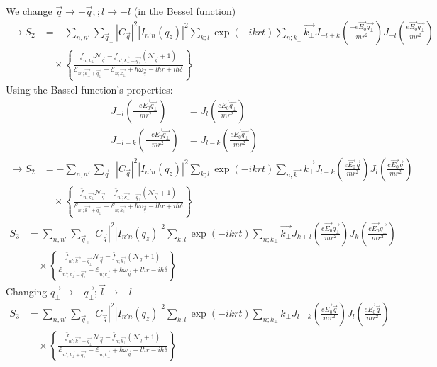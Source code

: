 \documentclass{article}
\begin{document}
We change $\vec{q}\to -\vec{q};;l\to -l$ (in the Bessel function)
\begin{align*}
\to S_2 &= - \sum_{n,n'} \sum_{\vec{q}_{\bot}} |C_{\vec{q}}|^2 |I_{n'n}(q_z)|^2 \sum_{k;l} \exp(-ikrt) \sum_{n;k_\bot}\vec{k_\bot} J_{-l+k} \left( \frac{-e\vec{E_0} \vec{q_\bot}}{m r^2} \right) J_{-l} \left( \frac{e\vec{E_0} \vec{q_\bot}}{m r^2} \right) \\
&\quad \times \left\{\frac{\bar{f}_{n;\vec{k_\bot}} \mathcal{N}_{\vec{q}} - \bar{f}_{n';\vec{k_\bot}+\vec{q_\bot}} (\mathcal{N}_{\vec{q}}+1)}{\mathcal{E}_{n';\vec{k_\bot}+\vec{q_\bot}} - \mathcal{E}_{n;\vec{k_\bot}} + \hbar \omega_{\vec{q}} - l\hbar r + i\hbar\delta} \right\}
\end{align*}
Using the Bassel function's properties:
\begin{align*}
    J_{-l} \left( \frac{-e\vec{E_0} \vec{q_\bot}}{m r^2} \right) &= J_l \left( \frac{e\vec{E_0} \vec{q_\bot}}{m r^2} \right)\\
J_{-l+k} \left( \frac{-e\vec{E_0} \vec{q_\bot}}{m r^2} \right) &= J_{l-k} \left( \frac{e\vec{E_0} \vec{q_\bot}}{m r^2} \right)
\end{align*}
\begin{align*}
    \to S_2 &= - \sum_{n,n'} \sum_{\vec{q}_{\bot}} |C_{\vec{q}}|^2 |I_{n'n}(q_z)|^2 \sum_{k;l} \exp(-ikrt) \sum_{n;\vec{k_\bot}}\vec{k_\bot} J_{l-k} \left( \frac{e\vec{E_0} \vec{q}}{m r^2} \right) J_{l} \left( \frac{e\vec{E_0} \vec{q}}{m r^2} \right) \\
&\quad \times \left\{\frac{\bar{f}_{n;\vec{k_\bot}} \mathcal{N}_{\vec{q}} - \bar{f}_{n';\vec{k_\bot}+\vec{q_\bot}} (\mathcal{N}_{\vec{q}}+1)}{\mathcal{E}_{n';\vec{k_\bot}+\vec{q_\bot}} - \mathcal{E}_{n;\vec{k_\bot}} + \hbar \omega_{\vec{q}} - l\hbar r + i\hbar\delta} \right\}
\end{align*}
\begin{align*}
 S_3 &= \sum_{n,n'} \sum_{\vec{q}_{\bot}} |C_{\vec{q}}|^2 |I_{n'n}(q_z)|^2 \sum_{k;l} \exp(-ikrt) \sum_{n;k_\bot}\vec{k_\bot} J_{k+l} \left( \frac{e\vec{E_0} \vec{q_\bot}}{m r^2} \right) J_{k} \left( \frac{e\vec{E_0} \vec{q_\bot}}{m r^2} \right) \\
&\quad \times \left\{\frac{\bar{f}_{n';\vec{k_\bot}-\vec{q_\bot}} \mathcal{N}_{\vec{q}} - \bar{f}_{n;\vec{k_\bot}} (\mathcal{N}_{q}+1)}{\mathcal{E}_{n';\vec{k_\bot}-\vec{q_\bot}} - \mathcal{E}_{n;\vec{k_\bot}} + \hbar \omega_{\vec{q}} + l\hbar r - i\hbar\delta} \right\}
\end{align*}
Changing $\vec{q_\bot}\to -\vec{q_\bot}; \vec{l} \to -l$
\begin{align*}
 S_3 &= \sum_{n,n'} \sum_{\vec{q}_{\bot}} |C_{\vec{q}}|^2 |I_{n'n}(q_z)|^2 \sum_{k;l} \exp(-ikrt) \sum_{n;k_\bot}k_\bot J_{l-k} \left( \frac{e\vec{E_0} \vec{q}}{m r^2} \right) J_{l} \left( \frac{e\vec{E_0} \vec{q}}{m r^2} \right) \\
&\quad \times \left\{\frac{\bar{f}_{n';\vec{k_\bot}+\vec{q_\bot}} \mathcal{N}_{\vec{q}} - \bar{f}_{n;\vec{k_\bot}} (\mathcal{N}_{q}+1)}{\mathcal{E}_{n';\vec{k_\bot}+\vec{q_\bot}} - \mathcal{E}_{n;\vec{k_\bot}} + \hbar \omega_{\vec{q}} - l\hbar r - i\hbar\delta} \right\}
\end{align*}
\end{document}
